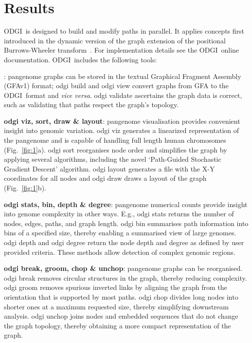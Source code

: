 \documentclass{bioinfo}
\newcommand{\odgi}{ODGI}
\newcommand{\cmd}[1]{{\scriptsize\textrm{#1}}}
\newcommand{\cmdbf}[1]{{\textbf{#1}}}
\newcommand{\topic}[1]{{\cmdbf{#1}}:}
\begin{document}
    \vspace{-0.1in}

    \section{Results}

    \odgi\ is designed to build and modify paths in parallel. It
    applies concepts first introduced in the dynamic version of the
    graph extension of the positional Burrows-Wheeler
    transform~\citep{Siren:2020}. For implementation details see the
    \odgi\ online documentation. \odgi\ includes the following tools:

    \indent \topic{odgi build, view \& validate} pangenome graphs can be
    stored in the textual Graphical Fragment Assembly
    (GFAv1) format\citep{GFA}; \cmd{odgi build} and \cmd{odgi view}
    convert graphs from GFA to the \odgi\ format and \textit{vice versa}.
    \cmd{odgi validate} ascertains the graph data is correct, such as
    validating that paths respect the graph's topology.

    \topic{odgi viz, sort, draw \& layout} pangenome visualisation
    provides convenient insight into genomic variation. \cmd{odgi viz}
    generates a linearized representation of the pangenome and is
    capable of handling full length human chromosomes
    (Fig.~\ref{fig:1}a). \cmd{odgi sort} reorganises node order and
    simplifies the graph by applying several algorithms, including the
    novel `Path-Guided Stochastic Gradient Descent' algorithm.
    \cmd{odgi layout} generates a file with the X-Y coordinates for
    all nodes and \cmd{odgi draw} draws a layout of the graph
    (Fig.~\ref{fig:1}b).

    \topic{odgi stats, bin, depth \& degree} pangenome numerical
    counts provide insight into genome complexity in other
    ways. E.g., \cmd{odgi stats} returns the number of nodes,
    edges, paths, and graph length. \cmd{odgi bin} summarises path
    information into bins of a specified size, thereby enabling a
    summarised view of large genomes. \cmd{odgi depth} and
    \cmd{odgi degree} return the node depth and degree as defined by
    user provided criteria. These methods allow detection of complex
    genomic regions.

    \topic{odgi break, groom, chop \& unchop} pangenome graphs can be
    reorganised.  \cmd{odgi break} removes circular structures in the
    graph, thereby reducing complexity. \cmd{odgi groom} removes
    spurious inverted links by aligning the graph from the orientation
    that is supported by most paths. \cmd{odgi chop} divides long
    nodes into shorter ones at a maximum requested size, thereby
    simplifying downstream analysis.  \cmd{odgi unchop} joins nodes
    and embedded sequences that do not change the graph topology,
    thereby obtaining a more compact representation of the graph.
\end{document}
